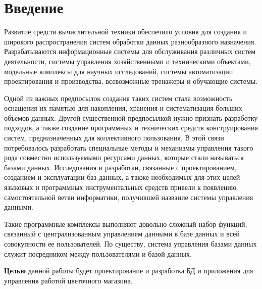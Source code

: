 \section*{Введение}
%

Развитие средств вычислительной техники обеспечило условия для создания и широкого распространения систем обработки данных разнообразного назначения. Разрабатываются информационные системы для обслуживания различных систем деятельности, системы управления хозяйственными и техническими объектами, модельные комплексы для научных исследований, системы автоматизации проектирования и производства, всевозможные тренажеры и обучающие системы. 

Одной из важных предпосылок создания таких систем стала возможность оснащения их памятью для накопления, хранения и систематизация больших объемов данных. Другой существенной предпосылкой нужно признать разработку подходов, а также создание программных и технических средств конструирования систем, предназначенных для коллективного пользования. В этой связи потребовалось разработать специальные методы и механизмы управления  такого рода совместно используемыми ресурсами данных, которые стали называться базами данных. Исследования и разработки, связанные с проектированием, созданием и эксплуатации баз данных, а также необходимых для этих целей языковых и программных инструментальных средств  привели к появлению самостоятельной ветви информатики, получившей название системы управления данными.

Такие программные комплексы выполняют довольно сложный набор функций, связанный с централизованным управлениям  данными в базе данных и всей совокупности ее пользователей. По существу, система управления базами данных служит посредником между пользователями и базой данных.

\textbf{Целью} данной работы будет проектирование и разработка БД и приложения для управления работой цветочного магазина.

